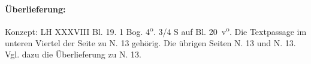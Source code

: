       
               
                \begin{ledgroupsized}[r]{120mm}
                \footnotesize 
                \pstart                
                \noindent\textbf{\"{U}berlieferung:}   
                \pend
                \end{ledgroupsized}
            
              
                            \begin{ledgroupsized}[r]{114mm}
                            \footnotesize 
                            \pstart \parindent -6mm
                            Konzept: LH XXXVIII Bl. 19. 1 Bog. 4\textsuperscript{o}. 3/4 S auf Bl. 20~v\textsuperscript{o}. Die Textpassage im unteren Viertel der Seite zu N. 13\protect{} geh\"{o}rig. Die \"{u}brigen Seiten N. 13\protect{} und N. 13\protect{}. Vgl. dazu die \"{U}berlieferung zu N. 13\protect{}. \pend
                            \end{ledgroupsized}
              
